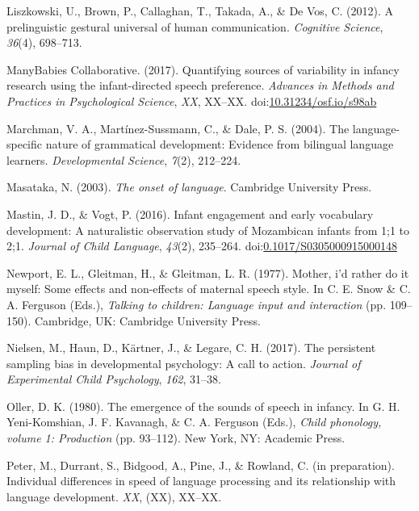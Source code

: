 \documentclass[floatsintext,man]{apa6}
\theoremstyle{definition}
\theoremstyle{definition}
\theoremstyle{definition}
\theoremstyle{remark}
\begin{document}
\hypertarget{ref-liszkowski2012prelinguistic}{}
Liszkowski, U., Brown, P., Callaghan, T., Takada, A., \& De Vos, C.
(2012). A prelinguistic gestural universal of human communication.
\emph{Cognitive Science}, \emph{36}(4), 698--713.

\hypertarget{ref-manybabies2017}{}
ManyBabies Collaborative. (2017). Quantifying sources of variability in
infancy research using the infant-directed speech preference.
\emph{Advances in Methods and Practices in Psychological Science},
\emph{XX}, XX--XX.
doi:\href{https://doi.org/10.31234/osf.io/s98ab}{10.31234/osf.io/s98ab}

\hypertarget{ref-marchman2004language}{}
Marchman, V. A., Martínez-Sussmann, C., \& Dale, P. S. (2004). The
language-specific nature of grammatical development: Evidence from
bilingual language learners. \emph{Developmental Science}, \emph{7}(2),
212--224.

\hypertarget{ref-masataka2003onset}{}
Masataka, N. (2003). \emph{The onset of language}. Cambridge University
Press.

\hypertarget{ref-mastin2016infant}{}
Mastin, J. D., \& Vogt, P. (2016). Infant engagement and early
vocabulary development: A naturalistic observation study of Mozambican
infants from 1;1 to 2;1. \emph{Journal of Child Language}, \emph{43}(2),
235--264.
doi:\href{https://doi.org/0.1017/S0305000915000148}{0.1017/S0305000915000148}

\hypertarget{ref-newport1977mother}{}
Newport, E. L., Gleitman, H., \& Gleitman, L. R. (1977). Mother, i'd
rather do it myself: Some effects and non-effects of maternal speech
style. In C. E. Snow \& C. A. Ferguson (Eds.), \emph{Talking to
children: Language input and interaction} (pp. 109--150). Cambridge, UK:
Cambridge University Press.

\hypertarget{ref-nielsen2017persistent}{}
Nielsen, M., Haun, D., Kärtner, J., \& Legare, C. H. (2017). The
persistent sampling bias in developmental psychology: A call to action.
\emph{Journal of Experimental Child Psychology}, \emph{162}, 31--38.

\hypertarget{ref-oller1980emergence}{}
Oller, D. K. (1980). The emergence of the sounds of speech in infancy.
In G. H. Yeni-Komshian, J. F. Kavanagh, \& C. A. Ferguson (Eds.),
\emph{Child phonology, volume 1: Production} (pp. 93--112). New York,
NY: Academic Press.

\hypertarget{ref-peterIPindividual}{}
Peter, M., Durrant, S., Bidgood, A., Pine, J., \& Rowland, C. (in
preparation). Individual differences in speed of language processing and
its relationship with language development. \emph{XX}, (XX), XX--XX.
\end{document}
